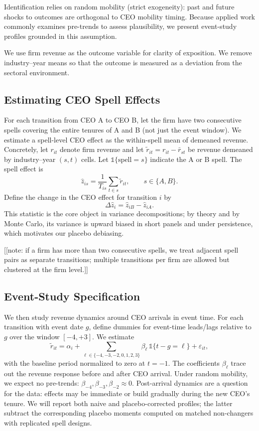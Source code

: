 \documentclass[11pt,a4paper]{article}
\begin{document}
Identification relies on random mobility (strict exogeneity): past and future shocks to outcomes are orthogonal to CEO mobility timing. Because applied work commonly examines pre-trends to assess plausibility, we present event-study profiles grounded in this assumption.

We use firm revenue as the outcome variable for clarity of exposition. We remove industry–year means so that the outcome is measured as a deviation from the sectoral environment.

\subsection*{Estimating CEO Spell Effects}
For each transition from CEO A to CEO B, let the firm have two consecutive spells covering the entire tenures of A and B (not just the event window). We estimate a spell-level CEO effect as the within-spell mean of demeaned revenue. Concretely, let \(r_{it}\) denote firm revenue and let \(\tilde r_{it}=r_{it}-\bar r_{st}\) be revenue demeaned by industry–year \((s,t)\) cells. Let \(\mathbb 1\{\text{spell}=s\}\) indicate the A or B spell. The spell effect is
\begin{equation}
\hat z_{is} = \frac{1}{T_{is}}\sum_{t\in s} \tilde r_{it},\qquad s\in\{A,B\}.
\end{equation}
Define the change in the CEO effect for transition \(i\) by
\begin{equation}
\Delta \hat z_i = \hat z_{iB} - \hat z_{iA}.
\end{equation}
This statistic is the core object in variance decompositions; by theory and by Monte Carlo, its variance is upward biased in short panels and under persistence, which motivates our placebo debiasing.

[[note: if a firm has more than two consecutive spells, we treat adjacent spell pairs as separate transitions; multiple transitions per firm are allowed but clustered at the firm level.]]

\subsection*{Event-Study Specification}
We then study revenue dynamics around CEO arrivals in event time. For each transition with event date \(g\), define dummies for event-time leads/lags relative to \(g\) over the window \([-4,+3]\). We estimate
\begin{equation}
\tilde r_{it} = \alpha_i + \sum_{\ell\in\{-4,-3,-2,0,1,2,3\}} \beta_{\ell}\,\mathbb 1\{t-g=\ell\} + \varepsilon_{it},
\end{equation}
with the baseline period normalized to zero at \(t=-1\). The coefficients \(\beta_{\ell}\) trace out the revenue response before and after CEO arrival. Under random mobility, we expect no pre-trends: \(\beta_{-4},\beta_{-3},\beta_{-2}\approx 0\). Post-arrival dynamics are a question for the data: effects may be immediate or build gradually during the new CEO’s tenure. We will report both naive and placebo-corrected profiles; the latter subtract the corresponding placebo moments computed on matched non-changers with replicated spell designs.
\end{document}
